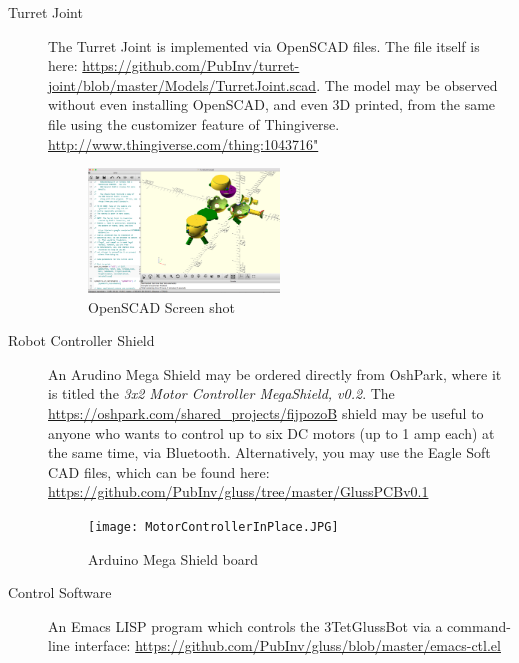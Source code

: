 \documentclass[12pt]{article}
\begin{document}
\begin{description}
  
\item [Turret Joint]
  The Turret Joint is implemented via OpenSCAD files. The file itself is here:
  \href{https://github.com/PubInv/turret-joint/blob/master/Models/TurretJoint.scad}
       {https://github.com/PubInv/turret-joint/blob/master/Models/TurretJoint.scad}.
       The model may be observed without even installing OpenSCAD, and even 3D printed,
       from the same file using the customizer feature of Thingiverse.
       \href{http://www.thingiverse.com/thing:1043716"}{http://www.thingiverse.com/thing:1043716"}
  \begin{figure}[!ht]
    \centering
    \includegraphics[width=0.5\textwidth]{OpenSCADScreen.png}
    \caption{OpenSCAD Screen shot}
  \end{figure}
  
\item [Robot Controller Shield]
  An Arudino Mega Shield may be ordered directly from OshPark, where it is titled the \emph{3x2 Motor Controller MegaShield, v0.2}.
  The \href{https://oshpark.com/shared_projects/fijpozoB}{https://oshpark.com/shared\_projects/fijpozoB} shield
  may be useful to anyone who wants to control up to six DC motors (up to 1 amp each) at the same time, via Bluetooth.
  Alternatively, you may use the Eagle Soft CAD files, which can be found here:
  \href{https://github.com/PubInv/gluss/tree/master/GlussPCBv0.1}
  {https://github.com/PubInv/gluss/tree/master/GlussPCBv0.1}
  \begin{figure}[!ht]
    \centering
    \texttt{[image: MotorControllerInPlace.JPG]}
    \caption{Arduino Mega Shield board}
  \end{figure}

\item [Control Software]
An Emacs LISP program which controls the 3TetGlussBot via a command-line interface:
\href{https://github.com/PubInv/gluss/blob/master/emacs-ctl.el}{https://github.com/PubInv/gluss/blob/master/emacs-ctl.el}


\end{description}
\end{document}
